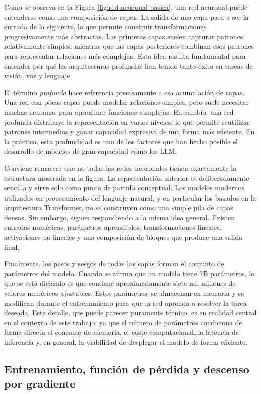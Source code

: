 \documentclass[11pt,a4paper]{article}
\begin{document}
Como se observa en la Figura \ref{fig:red-neuronal-basica}, una red neuronal puede entenderse como una composición de capas. La salida de una capa pasa a ser la entrada de la siguiente, lo que permite construir transformaciones progresivamente más abstractas. Las primeras capas suelen capturar patrones relativamente simples, mientras que las capas posteriores combinan esos patrones para representar relaciones más complejas. Esta idea resulta fundamental para entender por qué las arquitecturas profundas han tenido tanto éxito en tareas de visión, voz y lenguaje.

El término \textit{profunda} hace referencia precisamente a esa acumulación de capas. Una red con pocas capas puede modelar relaciones simples, pero suele necesitar muchas neuronas para aproximar funciones complejas. En cambio, una red profunda distribuye la representación en varios niveles, lo que permite reutilizar patrones intermedios y ganar capacidad expresiva de una forma más eficiente. En la práctica, esta profundidad es uno de los factores que han hecho posible el desarrollo de modelos de gran capacidad como los LLM.

Conviene remarcar que no todas las redes neuronales tienen exactamente la estructura mostrada en la figura. La representación anterior es deliberadamente sencilla y sirve solo como punto de partida conceptual. Los modelos modernos utilizados en procesamiento del lenguaje natural, y en particular los basados en la arquitectura Transformer, no se construyen como una simple pila de capas densas. Sin embargo, siguen respondiendo a la misma idea general. Existen entradas numéricas, parámetros aprendibles, transformaciones lineales, activaciones no lineales y una composición de bloques que produce una salida final.

Finalmente, los pesos y sesgos de todas las capas forman el conjunto de parámetros del modelo. Cuando se afirma que un modelo tiene 7B parámetros, lo que se está diciendo es que contiene aproximadamente siete mil millones de valores numéricos ajustables. Estos parámetros se almacenan en memoria y se modifican durante el entrenamiento para que la red aprenda a resolver la tarea deseada. Este detalle, que puede parecer puramente técnico, es en realidad central en el contexto de este trabajo, ya que el número de parámetros condiciona de forma directa el consumo de memoria, el coste computacional, la latencia de inferencia y, en general, la viabilidad de desplegar el modelo de forma eficiente.
\subsection{Entrenamiento, función de pérdida y descenso por gradiente}
\end{document}
